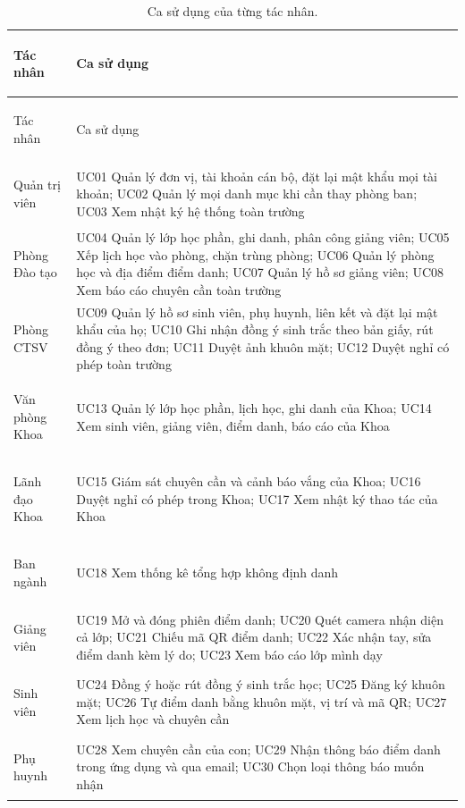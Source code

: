 {\footnotesize
\begin{xltabular}{\textwidth}{@{}>{\bfseries\raggedright\arraybackslash}p{2.7cm} >{\raggedright\arraybackslash}X@{}}
\caption{Ca sử dụng của từng tác nhân.}
\label{tab:casudung}\\
\toprule
Tác nhân & Ca sử dụng \\
\midrule
\endfirsthead
\toprule
Tác nhân & Ca sử dụng \\
\midrule
\endhead
\bottomrule
\endfoot
Quản trị viên & UC01 Quản lý đơn vị, tài khoản cán bộ, đặt lại mật khẩu mọi tài khoản;
  UC02 Quản lý mọi danh mục khi cần thay phòng ban;
  UC03 Xem nhật ký hệ thống toàn trường \\
Phòng Đào tạo & UC04 Quản lý lớp học phần, ghi danh, phân công giảng viên;
  UC05 Xếp lịch học vào phòng, chặn trùng phòng;
  UC06 Quản lý phòng học và địa điểm điểm danh;
  UC07 Quản lý hồ sơ giảng viên;
  UC08 Xem báo cáo chuyên cần toàn trường \\
Phòng CTSV & UC09 Quản lý hồ sơ sinh viên, phụ huynh, liên kết và đặt lại mật khẩu của họ;
  UC10 Ghi nhận đồng ý sinh trắc theo bản giấy, rút đồng ý theo đơn;
  UC11 Duyệt ảnh khuôn mặt;
  UC12 Duyệt nghỉ có phép toàn trường \\
Văn phòng Khoa & UC13 Quản lý lớp học phần, lịch học, ghi danh của Khoa;
  UC14 Xem sinh viên, giảng viên, điểm danh, báo cáo của Khoa \\
Lãnh đạo Khoa & UC15 Giám sát chuyên cần và cảnh báo vắng của Khoa;
  UC16 Duyệt nghỉ có phép trong Khoa;
  UC17 Xem nhật ký thao tác của Khoa \\
Ban ngành & UC18 Xem thống kê tổng hợp không định danh \\
Giảng viên & UC19 Mở và đóng phiên điểm danh;
  UC20 Quét camera nhận diện cả lớp;
  UC21 Chiếu mã QR điểm danh;
  UC22 Xác nhận tay, sửa điểm danh kèm lý do;
  UC23 Xem báo cáo lớp mình dạy \\
Sinh viên & UC24 Đồng ý hoặc rút đồng ý sinh trắc học;
  UC25 Đăng ký khuôn mặt;
  UC26 Tự điểm danh bằng khuôn mặt, vị trí và mã QR;
  UC27 Xem lịch học và chuyên cần \\
Phụ huynh & UC28 Xem chuyên cần của con;
  UC29 Nhận thông báo điểm danh trong ứng dụng và qua email;
  UC30 Chọn loại thông báo muốn nhận \\
\end{xltabular}}


